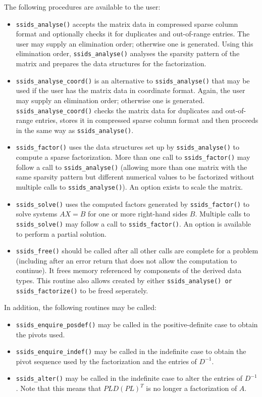 \documentclass{spral}
\begin{document}
\medskip

\noindent
The following procedures are available to the user:
\begin{itemize}
\item {\tt ssids\_analyse()} accepts the matrix data in compressed
sparse column format and optionally checks it for duplicates and  out-of-range entries.
The user may supply an elimination order; otherwise
one is generated. Using this elimination order,
{\tt ssids\_analyse()} analyses the sparsity pattern of
the matrix and prepares the data structures for the factorization.

 \item {\tt ssids\_analyse\_coord()} is an alternative to
{\tt ssids\_analyse()} that may be used if the user has
the matrix data in coordinate
format. Again, the user may supply an elimination order; otherwise
one is generated. {\tt ssids\_analyse\_coord()}
checks the matrix data  for duplicates and  out-of-range entries,
stores
it in compressed sparse column format and then proceeds
in the same way as {\tt ssids\_analyse()}.

\item {\tt ssids\_factor()} uses the data structures
set up by {\tt ssids\_analyse()} to compute a sparse
factorization. More than one call to  {\tt ssids\_factor()}
may follow a call to {\tt ssids\_analyse()} (allowing more than
one matrix with the same sparsity pattern but different
numerical values to be factorized without multiple calls to
{\tt ssids\_analyse()}).
An option exists to scale the matrix.

\item {\tt ssids\_solve()} uses the computed factors generated
by  {\tt ssids\_factor()}
to solve systems ${AX= B}$
for one or more right-hand sides $B$.
Multiple calls to {\tt ssids\_solve()} may follow a call to
{\tt ssids\_factor()}.
An option is available to perform a partial solution.

\item {\tt ssids\_free()} should be called after all other calls
are complete for a problem (including after an error
return that does not allow the computation
to continue). It frees memory referenced by components of
the derived data types. This routine also allows created by either
{\tt ssids\_analyse() or ssids\_factorize()} to be freed seperately.
\end{itemize}

\noindent
In addition, the following routines may be called:
\begin{itemize}
\item {\tt ssids\_enquire\_posdef()} may be called
in the  positive-definite case to obtain the pivots used.
\item {\tt ssids\_enquire\_indef()} may be called
in the indefinite case to obtain the pivot sequence used by the factorization
and the entries of  ${D}^{-1}$.
\item {\tt ssids\_alter()} may be called in the indefinite case to alter
the entries of ${D}^{-1}$.
Note that this means that  $PLD(PL)^T$ is no longer
a factorization of $A$.

\end{itemize}
\end{document}
